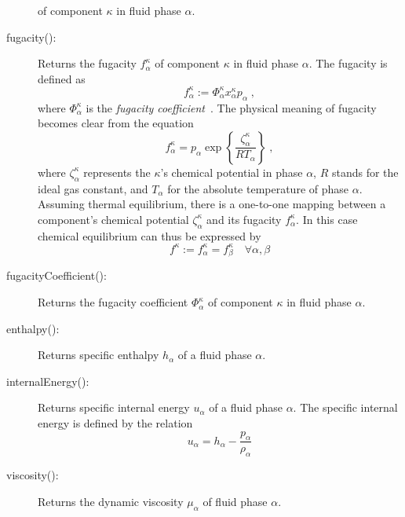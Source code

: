 \begin{description}
  of component $\kappa$ in fluid phase $\alpha$.
\item[fugacity():] Returns the fugacity $f^\kappa_\alpha$ of component
  $\kappa$ in fluid phase $\alpha$. The fugacity is defined as
  \[
  f_\alpha^\kappa := \Phi^\kappa_\alpha x^\kappa_\alpha p_\alpha \;,
  \]
  where $\Phi^\kappa_\alpha$ is the {\em fugacity
    coefficient}~\cite{reid1987}.  The physical meaning of fugacity
  becomes clear from the equation
  \[
  f_\alpha^\kappa = p_\alpha \exp\left\{\frac{\zeta^\kappa_\alpha}{R T_\alpha} \right\} \;,
  \]
  where $\zeta^\kappa_\alpha$ represents the $\kappa$'s chemical
  potential in phase $\alpha$, $R$ stands for the ideal gas constant,
  and $T_\alpha$ for the absolute temperature of phase
  $\alpha$. Assuming thermal equilibrium, there is a one-to-one
  mapping between a component's chemical potential
  $\zeta^\kappa_\alpha$ and its fugacity $f^\kappa_\alpha$. In this
  case chemical equilibrium can thus be expressed by
  \[
  f^\kappa := f^\kappa_\alpha = f^\kappa_\beta\quad\forall \alpha, \beta
  \]
\item[fugacityCoefficient():] Returns the fugacity coefficient
  $\Phi^\kappa_\alpha$ of component $\kappa$ in fluid phase $\alpha$.
\item[enthalpy():] Returns specific enthalpy $h_\alpha$ of a fluid
  phase $\alpha$.
\item[internalEnergy():] Returns specific internal energy $u_\alpha$
  of a fluid phase $\alpha$. The specific internal energy is defined
  by the relation
  \[
  u_\alpha = h_\alpha - \frac{p_\alpha}{\rho_\alpha}
  \]
\item[viscosity():] Returns the dynamic viscosity
  $\mu_\alpha$ of fluid phase $\alpha$.
\end{description}
  
